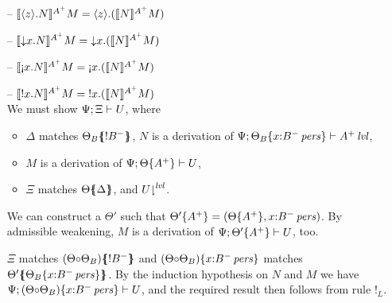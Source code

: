 \begin{itemize}
\item[--] $\lsubsta{\tetap{z}{N}}{M}{A^+} 
           = \tetap{z}{(\lsubsta{N}{M}{A^+})}$
\item[--] $\lsubsta{\tdownl{x}{N}}{M}{A^+} 
           = \tdownl{x}{(\lsubsta{N}{M}{A^+})}$
\item[--] $\lsubsta{\tgnabl{x}{N}}{M}{A^+} 
           = \tgnabl{x}{(\lsubsta{N}{M}{A^+})}$
\item[--] $\lsubsta{\tbangl{x}{N}}{M}{A^+} 
           = \tbangl{x}{(\lsubsta{N}{M}{A^+})}$\smallskip\\
  We must show $\foc{\Psi}{\Xi}{U}$, where
  \begin{itemize}
  \item $\Delta$ matches $\frameoff{\Theta_B}{{!}B^-}$, 
    $N$ is a derivation of
    $\foc{\Psi}{\tackon{\Theta_B}{\ispers{x{:}B^-}}}{\islvl{A^+}}$,
  \item $M$ is a derivation of $\foc{\Psi}{\tackon{\Theta}{A^+}}{U}$,
  \item $\Xi$ matches $\frameoff{\Theta}{\Delta}$, and
    $\restrictfrom{U}{\mlvl}$.
  \end{itemize}
  We can construct a $\Theta'$ such that 
  $\tackon{\Theta'}{A^+} = (\tackon{\Theta}{A^+},x{:}\ispers{B^-})$. By
  admissible weakening, $M$ is a derivation of 
  $\foc{\Psi}{\tackon{\Theta'}{A^+}}{U}$, too.

  $\Xi$ matches $\frameoff{(\Theta {\circ} \Theta_B)}{{!}B^-}$ and
  $\tackon{(\Theta {\circ} \Theta_B)}{x{:}\ispers{B^-}}$ matches
  $\frameoff{\Theta'}{\tackon{\Theta_B}{x{:}\ispers{B^-}}}$.
  By the induction hypothesis on $N$ and $M$ we have 
  $\foc{\Psi}{\tackon{(\Theta {\circ}
      \Theta_B)}{x{:}\ispers{B^-}}}{U}$, and the required
  result then follows from rule ${!}_L$. \smallskip


\end{itemize}
